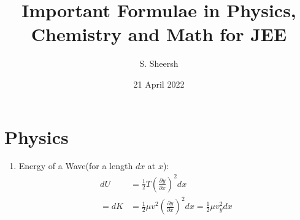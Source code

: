 \documentclass{article}
\title{\textbf{Important Formulae in Physics, Chemistry and Math for JEE}}
\author{S. Sheersh}
\date{21 April 2022}
\numberwithin{equation}{section}
\numberwithin{figure}{section}
\begin{document}
\maketitle
\section{Physics}
\begin{enumerate}

	\item Energy of a Wave(for a length $dx$ at $x$): 
		\begin{align}
			dU &=\frac{1}{2}T\left(\frac{\partial y}{\partial x} \right)^2dx\\
			=dK &=\frac{1}{2} \mu v^2 \left(\frac{\partial y}{\partial x} \right)^2dx=\frac{1}{2}\mu v^2_{y} dx
		\end{align}


\end{enumerate}
\end{document}
